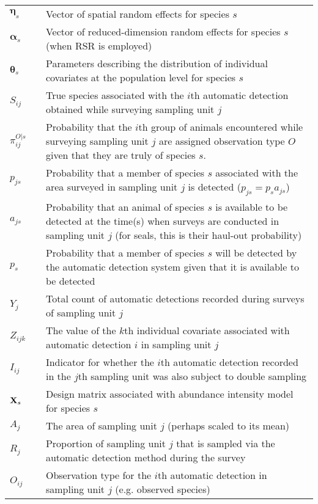 \documentclass[12pt,fleqn]{article}
\begin{document}
\begin{flushleft}
\begin{longtable}{p{1.5cm}l p{14cm}}
$\boldsymbol{\eta}_s$ & & Vector of spatial random effects for species $s$ \\
$\boldsymbol{\alpha}_s$ & & Vector of reduced-dimension random effects for species $s$ (when RSR is employed)\\
$\boldsymbol{\theta}_s$ & & Parameters describing the distribution of individual covariates
                          at the population level for species $s$ \\
$S_{ij}$ & & True species associated with the $i$th automatic detection obtained while surveying sampling unit $j$ \\
$\pi_{ij}^{O|s}$ & & Probability that the $i$th group of animals encountered while surveying sampling unit $j$ are assigned observation type $O$ given that they are truly of species $s$.  \\
$p_{js}$ & & Probability that a member of species $s$ associated with the area surveyed in sampling
    unit $j$ is detected ($p_{js}=p_s a_{js}$)\\
$a_{js}$ & & Probability that an animal of species $s$ is available to be detected at the time(s)
    when surveys are conducted in sampling unit $j$ (for seals, this is their haul-out probability)\\
$p_s$ & & Probability that a member of species $s$ will be detected by the automatic detection system given that it is available to be detected \\
$Y_{j}$ & & Total count of automatic detections recorded during surveys of sampling unit $j$\\
$Z_{ijk}$   & &  The value of the $k$th individual covariate associated with automatic detection $i$
                in sampling unit $j$\\
$I_{ij}$  & & Indicator for whether the $i$th automatic detection recorded in the $j$th sampling unit was
        also subject to double sampling \\
${\bf X}_s$   & & Design matrix associated with abundance intensity model for species $s$\\
$A_j$   & & The area of sampling unit $j$ (perhaps scaled to its mean)\\
$R_j$  & & Proportion of sampling unit $j$ that is sampled via the automatic detection method during the survey\\
$O_{ij}$ & & Observation type for the $i$th automatic detection in sampling unit $j$ (e.g. observed species) \\

\end{longtable}
\end{flushleft}
\end{document}
